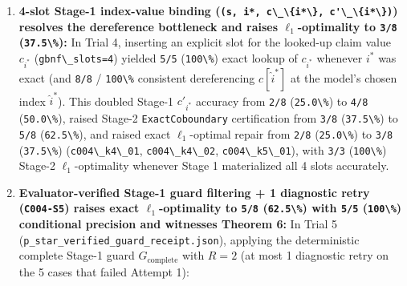 \documentclass[
  11pt,
]{article}
\newcommand{\passthrough}[1]{#1}
\begin{document}
\begin{enumerate}
  exposed the exact remaining bottleneck: \nolinkurl{openai/gpt-4o-mini}
  computed \(s\) accurately on \passthrough{\lstinline!7/8!}
  (\passthrough{\lstinline!87.5\%!}) cases and \(i^*\) accurately on
  \passthrough{\lstinline!5/8!} (\passthrough{\lstinline!62.5\%!})
  cases, but failed on slot 2 (\(c'_{i^*} = c_{i^*} - s\)) on
  \passthrough{\lstinline!3/5!} of the
  exact-\passthrough{\lstinline!(s, i*)!} cases because it had to
  dereference \(c_{i^*}\) at the just-emitted index \(i^*\) and subtract
  \(s\) in a single token step.
\item
  \textbf{4-slot Stage-1 index-value binding
  (\passthrough{\lstinline!(s, i*, c\_\{i*\}, c'\_\{i*\})!}) resolves
  the dereference bottleneck and raises \(\ell_1\)-optimality to
  \passthrough{\lstinline!3/8!} (\passthrough{\lstinline!37.5\%!}):} In
  Trial 4, inserting an explicit slot for the looked-up claim value
  \(c_{i^*}\) (\passthrough{\lstinline!gbnf\_slots=4!}) yielded
  \passthrough{\lstinline!5/5!} (\passthrough{\lstinline!100\%!}) exact
  lookup of \(c_{i^*}\) whenever \(i^*\) was exact (and
  \passthrough{\lstinline!8/8!} / \passthrough{\lstinline!100\%!}
  consistent dereferencing \(c[\hat{i}^*]\) at the model's chosen index
  \(\hat{i}^*\)). This doubled Stage-1 \(c'_{i^*}\) accuracy from
  \passthrough{\lstinline!2/8!} (\passthrough{\lstinline!25.0\%!}) to
  \passthrough{\lstinline!4/8!} (\passthrough{\lstinline!50.0\%!}),
  raised Stage-2 \nolinkurl{ExactCoboundary} certification from
  \passthrough{\lstinline!3/8!} (\passthrough{\lstinline!37.5\%!}) to
  \passthrough{\lstinline!5/8!} (\passthrough{\lstinline!62.5\%!}), and
  raised exact \(\ell_1\)-optimal repair from
  \passthrough{\lstinline!2/8!} (\passthrough{\lstinline!25.0\%!}) to
  \passthrough{\lstinline!3/8!} (\passthrough{\lstinline!37.5\%!})
  (\passthrough{\lstinline!c004\_k4\_01!},
  \passthrough{\lstinline!c004\_k4\_02!},
  \passthrough{\lstinline!c004\_k5\_01!}), with
  \passthrough{\lstinline!3/3!} (\passthrough{\lstinline!100\%!})
  Stage-2 \(\ell_1\)-optimality whenever Stage 1 materialized all 4
  slots accurately.
\item
  \textbf{Evaluator-verified Stage-1 guard filtering + 1 diagnostic
  retry (\passthrough{\lstinline!C004-S5!}) raises exact
  \(\ell_1\)-optimality to \passthrough{\lstinline!5/8!}
  (\passthrough{\lstinline!62.5\%!}) with \passthrough{\lstinline!5/5!}
  (\passthrough{\lstinline!100\%!}) conditional precision and witnesses
  Theorem 6:} In Trial 5
  (\nolinkurl{p_star_verified_guard_receipt.json}), applying the
  deterministic complete Stage-1 guard \(G_{\text{complete}}\) with
  \(R = 2\) (at most 1 diagnostic retry on the 5 cases that failed
  Attempt 1):


\end{enumerate}
\end{document}
